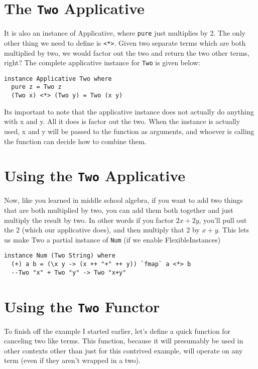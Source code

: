 \documentclass[12pt]{article}
\begin{document}
  \section{The \texttt{Two} Applicative}

  It is also an instance of Applicative, where \texttt{pure} just multiplies by 2. The only other thing we need to define is \texttt{<*>}. Given two separate terms which are both multiplied by two, we would factor out the two and return the two other terms, right? The complete applicative instance for \texttt{Two} is given below:

  \begin{verbatim}
instance Applicative Two where
  pure z = Two z
  (Two x) <*> (Two y) = Two (x y)
  \end{verbatim}

  Its important to note that the applicative instance does not actually do anything with x and y. All it does is factor out the two. When the instance is actually used, x and y will be passed to the function as arguments, and whoever is calling the function can decide how to combine them.

  \section{Using the \texttt{Two} Applicative}

  Now, like you learned in middle school algebra, if you want to add two things that are both multiplied by two, you can add them both together and just multiply the result by two. In other words if you factor \(2x + 2y\), you'll pull out the 2 (which our applicative does), and then multiply that 2 by \(x+y\). This lets us make Two a partial instance of \texttt{Num} (if we enable FlexibleInstances)

  \begin{verbatim}
instance Num (Two String) where
  (+) a b = (\x y -> (x ++ "+" ++ y)) `fmap` a <*> b
  --Two "x" + Two "y" -> Two "x+y"
  \end{verbatim}

  \section{Using the \texttt{Two} Functor}

  To finish off the example I started earlier, let's define a quick function for canceling two like terms. This function, because it will presumably be used in other contexts other than just for this contrived example, will operate on any term (even if they aren't wrapped in a two). 
\end{document}
